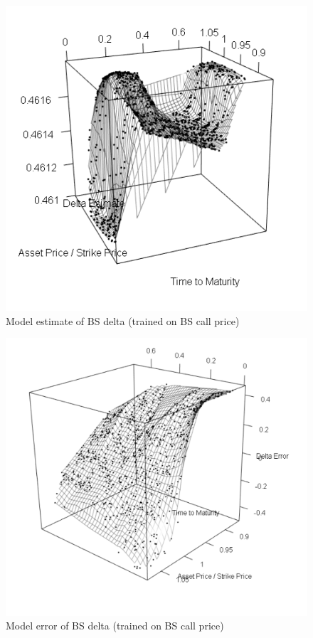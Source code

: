 \documentclass{sig-alternate-05-2015}
\begin{document}
\begin{figure}[p]
	\includegraphics[width=0.7\linewidth]{Delta_derived.png}
	\centering
	\caption{Model estimate of BS delta (trained on BS call price)}
			\label{fig:Delta_derived}
\end{figure} 

\begin{figure}[p]
	\includegraphics[width=0.7\linewidth]{Delta_err_derived.png}
	\centering
	\caption{Model error of BS delta (trained on BS call price)}
			\label{fig:Delta_derived_err}
\end{figure} 

 \clearpage 

\end{document}
